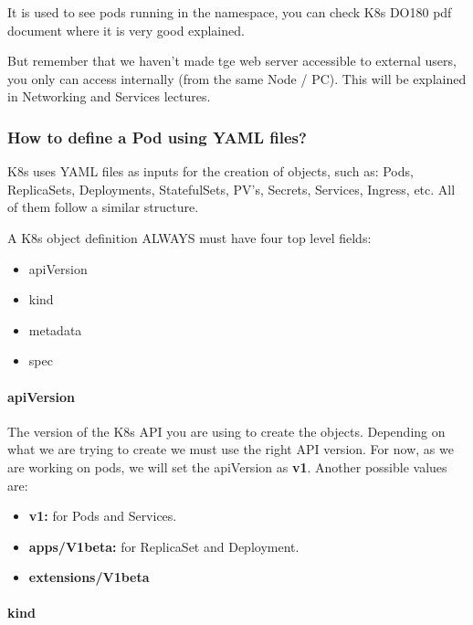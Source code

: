 \documentclass{article}
\newenvironment{blocktemplateIII}[1]{%
    \tcolorbox[beamer,%
    noparskip,breakable,
    ,colframe=Red,%
    colbacklower=LimeGreen!75!LightGreen,%
    title=#1]}%
    {\endtcolorbox}
\begin{document}
It is used to see pods running in the namespace, you can check K8s DO180 pdf document where it is very good explained.

But remember that we haven't made tge web server accessible to external users, you only can access internally (from the same Node / PC). This will be explained in Networking and Services lectures.

\subsubsection{How to define a Pod using YAML files?}

K8s uses YAML files as inputs for the creation of objects, such as: Pods, ReplicaSets, Deployments, StatefulSets, PV's, Secrets, Services, Ingress, etc. All of them follow a similar structure.

\begin{blocktemplateIII}{Note}
A K8s object definition ALWAYS must have four top level fields:
\begin{itemize}
    \item apiVersion
    \item kind
    \item metadata
    \item spec
\end{itemize}
\end{blocktemplateIII}

\paragraph{apiVersion}

The version of the K8s API you are using to create the objects. Depending on what we are trying to create we must use the right API version. For now, as we are working on pods, we will set the apiVersion as \textbf{v1}. Another possible values are:

\begin{itemize}
    \item \textbf{v1:} for Pods and Services.
    \item \textbf{apps/V1beta:} for ReplicaSet and Deployment.
    \item \textbf{extensions/V1beta}
\end{itemize}

\paragraph{kind}
\end{document}
